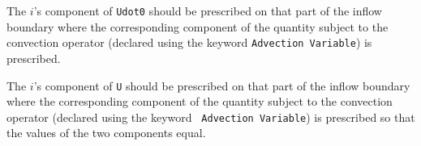 \sifbegin
{}  
The $i$'s component of {\tt Udot0} should be prescribed on that part of the
inflow boundary where the corresponding component of the quantity subject to 
the convection operator (declared using the keyword {\tt Advection Variable}) 
is prescribed.

The $i$'s component of {\tt U} should be prescribed on that part of
the inflow boundary where the corresponding component of the quantity
subject to the convection operator (declared using the keyword {\tt
Advection Va\-ri\-ab\-le}) is prescribed so that the values of the two
components equal.

\sifend 
\sifend




